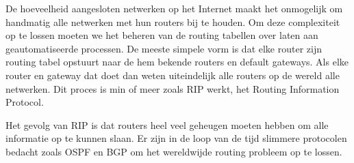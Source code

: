 De hoeveelheid aangesloten netwerken op het Internet maakt het onmogelijk om handmatig alle netwerken met hun routers bij te houden. Om deze complexiteit op te lossen moeten we het beheren van de routing tabellen over laten aan geautomatiseerde processen. De meeste simpele vorm is dat elke router zijn routing tabel opstuurt naar de hem bekende routers en default gateways. Als elke router en gateway dat doet dan weten uiteindelijk alle routers op de wereld alle netwerken. Dit proces is min of meer zoals RIP werkt, het Routing Information Protocol.

Het gevolg van RIP is dat routers heel veel geheugen moeten hebben om alle informatie op te kunnen slaan. Er zijn in de loop van de tijd slimmere protocolen bedacht zoals OSPF en BGP om het wereldwijde routing probleem op te lossen.

